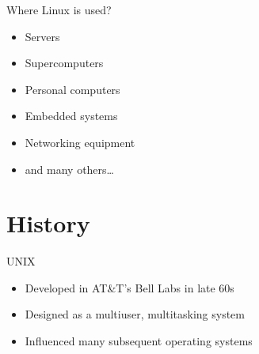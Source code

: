 \documentclass{beamer}
\begin{document}
\begin{frame}{Where Linux is used?}
  \begin{itemize}
    \item Servers
    \item Supercomputers
    \item Personal computers
    \item Embedded systems
    \item Networking equipment
    \item and many others\ldots
  \end{itemize}
\end{frame}

\section{History}

\begin{frame}{UNIX}
  \begin{itemize}
    \item Developed in AT\&T's Bell Labs in late 60s
    \item Designed as a multiuser, multitasking system
    \item Influenced many subsequent operating systems
  \end{itemize}
\end{frame}
\end{document}
